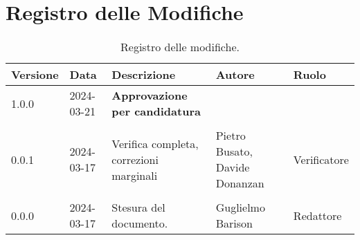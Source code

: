 \section*{Registro delle Modifiche}
\begin{table}[ht!]	
		\centering
		\begin{tabular}{p{1.2cm} p{2cm} p{6cm} p{3cm} p{2cm}}
			\toprule
			\textbf{Versione}& \textbf{Data} & \textbf{Descrizione} & \textbf{Autore} & \textbf{Ruolo} \\
			\midrule
			1.0.0 & 2024-03-21 & \textbf{Approvazione per candidatura} & &  \\\\
			0.0.1 & 2024-03-17 & Verifica completa, correzioni marginali  & Pietro Busato, Davide Donanzan & Verificatore \\\\
			0.0.0 & 2024-03-17 & Stesura del documento.  & Guglielmo Barison & Redattore \\
			\bottomrule
		\end{tabular}
		\caption{Registro delle modifiche.}
		\label{table:Registro delle modifiche}
\end{table}
